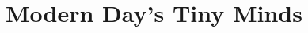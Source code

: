 \documentclass[../main]{subfiles}
\begin{document}
\chapter{Modern Day's Tiny Minds} \label{chp:}
\end{document}
